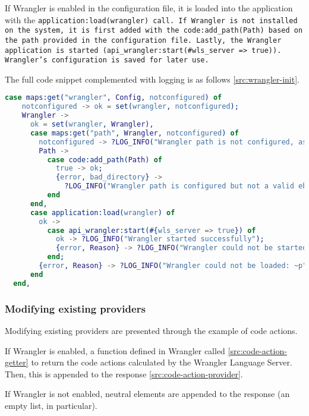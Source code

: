 If Wrangler is enabled in the configuration file, it is loaded into the application with the \tt application:load(wrangler)\rm\ call. If Wrangler is not installed on the system, it is first added with the \tt code:add\_path(Path)\rm\ based on the path provided in the configuration file. Lastly, the Wrangler application is started (\tt api\_wrangler:start(\#{wls\_server => true})\rm ). Wrangler's configuration is saved for later use.

The full code snippet complemented with logging is as follows \ref{src:wrangler-init}.

\begin{lstlisting}[language=erlang]
  case maps:get("wrangler", Config, notconfigured) of
    notconfigured -> ok = set(wrangler, notconfigured);
    Wrangler ->
      ok = set(wrangler, Wrangler),
      case maps:get("path", Wrangler, notconfigured) of
        notconfigured -> ?LOG_INFO("Wrangler path is not configured, assuming it is installed system-wide.");
        Path ->
          case code:add_path(Path) of
            true -> ok;
            {error, bad_directory} ->
              ?LOG_INFO("Wrangler path is configured but not a valid ebin directory: ~p", [Path])
          end
      end,
      case application:load(wrangler) of
        ok ->
          case api_wrangler:start(#{wls_server => true}) of
            ok -> ?LOG_INFO("Wrangler started successfully");
            {error, Reason} -> ?LOG_INFO("Wrangler could not be started: ~p", [Reason])
          end;
        {error, Reason} -> ?LOG_INFO("Wrangler could not be loaded: ~p", [Reason])
      end
  end,

\end{lstlisting}


\subsubsection{Modifying existing providers}

Modifying existing providers are presented through the example of code actions.

If Wrangler is enabled, a function defined in Wrangler called \ref{src:code-action-getter} to return the code actions calculated by the Wrangler Language Server. Then, this is appended to the response \ref{src:code-action-provider}. 

If Wrangler is not enabled, neutral elements are appended to the response (an empty list, in particular).


